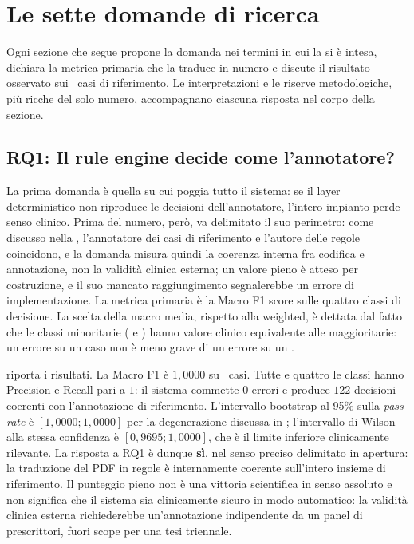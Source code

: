 \chapter{Le sette domande di ricerca}
\label{ch:valutazione}

Ogni sezione che segue propone la domanda nei termini in cui la si è intesa, dichiara la metrica primaria che la traduce in numero e discute il risultato osservato sui \goldn\ casi di riferimento. Le interpretazioni e le riserve metodologiche, più ricche del solo numero, accompagnano ciascuna risposta nel corpo della sezione.

\section{RQ1: Il rule engine decide come l'annotatore?}
\label{sec:rq1}

La prima domanda è quella su cui poggia tutto il sistema: se il layer deterministico non riproduce le decisioni dell'annotatore, l'intero impianto perde senso clinico. Prima del numero, però, va delimitato il suo perimetro: come discusso nella , l'annotatore dei casi di riferimento e l'autore delle regole coincidono, e la domanda misura quindi la coerenza interna fra codifica e annotazione, non la validità clinica esterna; un valore pieno è atteso per costruzione, e il suo mancato raggiungimento segnalerebbe un errore di implementazione. La metrica primaria è la Macro F1 score sulle quattro classi di decisione. La scelta della macro media, rispetto alla weighted, è dettata dal fatto che le classi minoritarie ( e ) hanno valore clinico equivalente alle maggioritarie: un errore su un caso  non è meno grave di un errore su un .

 riporta i risultati. La Macro F1 è $1{,}0000$ su \goldn\ casi. Tutte e quattro le classi hanno Precision e Recall pari a $1$: il sistema commette $0$ errori e produce $122$ decisioni coerenti con l'annotazione di riferimento. L'intervallo bootstrap al 95\% sulla \emph{pass rate} è $[1{,}0000;1{,}0000]$ per la degenerazione discussa in ; l'intervallo di Wilson alla stessa confidenza è $[0{,}9695;1{,}0000]$, che è il limite inferiore clinicamente rilevante. La risposta a RQ1 è dunque \textbf{sì}, nel senso preciso delimitato in apertura: la traduzione del PDF in regole è internamente coerente sull'intero insieme di riferimento. Il punteggio pieno non è una vittoria scientifica in senso assoluto e non significa che il sistema sia clinicamente sicuro in modo automatico: la validità clinica esterna richiederebbe un'annotazione indipendente da un panel di prescrittori, fuori scope per una tesi triennale.

